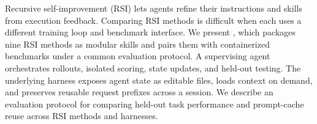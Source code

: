 Recursive self-improvement (RSI) lets agents refine their instructions and skills from execution feedback. Comparing RSI methods is difficult when each uses a different training loop and benchmark interface. We present \fwname, which packages nine RSI methods as modular skills and pairs them with containerized benchmarks under a common evaluation protocol. A supervising agent orchestrates rollouts, isolated scoring, state updates, and held-out testing. The underlying harness exposes agent state as editable files, loads context on demand, and preserves reusable request prefixes across a session. We describe an evaluation protocol for comparing held-out task performance and prompt-cache reuse across RSI methods and harnesses.

